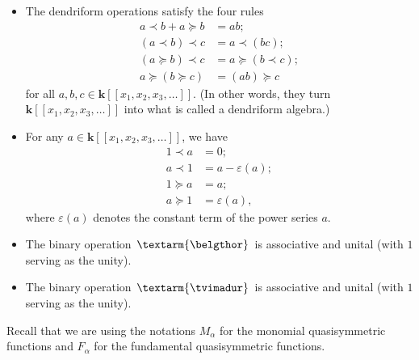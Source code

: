 \documentclass[numbers=enddot,12pt,final,onecolumn,notitlepage]{scrartcl}%
\theoremstyle{definition}
\newenvironment{verlong}{}{}
\newcommand{\tvi}{\left. \textarm{\tvimadur} \right.}
\newcommand{\bel}{\left. \textarm{\belgthor} \right.}
\begin{document}
\begin{verlong}
\begin{itemize}
\item The dendriform operations satisfy the four rules
\begin{align}
a\left.  \prec\right.  b+a\left.  \succeq\right.  b  &
=ab;\label{eq.dendriform.1}\\
\left(  a\left.  \prec\right.  b\right)  \left.  \prec\right.  c  &  =a\left.
\prec\right.  \left(  bc\right)  ;\nonumber\\
\left(  a\left.  \succeq\right.  b\right)  \left.  \prec\right.  c  &
=a\left.  \succeq\right.  \left(  b\left.  \prec\right.  c\right)
;\nonumber\\
a\left.  \succeq\right.  \left(  b\left.  \succeq\right.  c\right)   &
=\left(  ab\right)  \left.  \succeq\right.  c\nonumber
\end{align}
for all $a,b,c\in\mathbf{k}\left[  \left[  x_{1},x_{2},x_{3},\ldots\right]
\right]  $. (In other words, they turn $\mathbf{k}\left[  \left[  x_{1}%
,x_{2},x_{3},\ldots\right]  \right]  $ into what is called a dendriform algebra.)

\item For any $a\in\mathbf{k}\left[  \left[  x_{1},x_{2},x_{3},\ldots\right]
\right]  $, we have%
\begin{align}
1\left.  \prec\right.  a  &  =0;\label{eq.dendriform.1<a}\\
a\left.  \prec\right.  1  &  =a-\varepsilon\left(  a\right)
;\label{eq.dendriform.a<1}\\
1\left.  \succeq\right.  a  &  =a;\label{eq.dendriform.1>=a}\\
a\left.  \succeq\right.  1  &  =\varepsilon\left(  a\right)  ,
\label{eq.dendriform.a>=1}%
\end{align}
where $\varepsilon\left(  a\right)  $ denotes the constant term of the power
series $a$.

\item The binary operation $\bel$ is associative and unital (with $1$ serving
as the unity).

\item The binary operation $\tvi$ is associative and unital (with $1$ serving
as the unity).
\end{itemize}

Recall that we are using the notations $M_{\alpha}$ for the monomial
quasisymmetric functions and $F_{\alpha}$ for the fundamental quasisymmetric functions.


\end{verlong}
\end{document}
